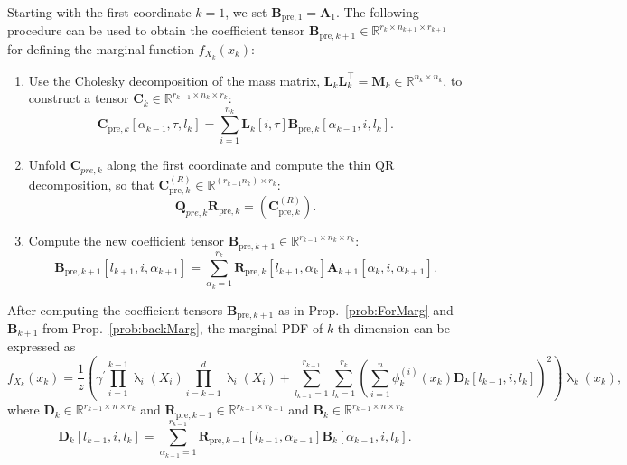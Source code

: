 \begin{prop}
	\label{prob:ForMarg}
	Starting with the first coordinate $k = 1$, we set $\bm{B}_{\text{pre},1} = \bm{A}_1$. The following procedure can be used to obtain the coefficient tensor $\bm{B}_{\text{pre},k+1} \in \mathbb{R}^{r_{k} \times n_{k+1} \times r_{k+1}}$ for defining the marginal function $f_{X_k}(x_k)$:
	\begin{enumerate}
		\item Use the Cholesky decomposition of the mass matrix, $\bm{L}_k \bm{L}_k^\top = \bm{M}_k \in \mathbb{R}^{n_k \times n_k}$, to construct a tensor $\bm{C}_k \in \mathbb{R}^{r_{k-1} \times n_k \times r_k}$:
		\begin{equation}
			\bm{C}_{\text{pre},k}[\alpha_{k-1}, \tau, l_k] = \sum_{i=1}^{n_k} \bm{L}_k[i, \tau] \bm{B}_{\text{pre},k}[\alpha_{k-1}, i, l_k] .
		\end{equation}
		\item Unfold $\bm{C}_{pre,k}$ along the first coordinate and compute the thin QR decomposition, so that $\bm{C}_{\text{pre},k}^{(R)} \in \mathbb{R}^{(r_{k-1} n_k ) \times r_k}$:
		\begin{equation}
			\bm{Q}_{pre,k}\bm{R}_{\text{pre},k} = {(\bm{C}_{\text{pre},k}^{(R)})}.
		\end{equation}
		\item Compute the new coefficient tensor $\bm{B}_{\text{pre}, k+1} \in \mathbb{R}^{r_{k-1} \times n_k \times r_k} $:
		\begin{equation}
			\bm{B}_{\text{pre}, k+1}[l_{k+1}, i, \alpha_{k+1}] = \sum_{\alpha_{k}=1}^{r_{k}} \bm{R}_{\text{pre},k}[l_{k+1}, \alpha_{k}] \bm{A}_{k+1}[\alpha_{k}, i, \alpha_{k+1}] .
		\end{equation}
	\end{enumerate}
\end{prop}
After computing the coefficient tensors $\bm{B}_{\text{pre}, k+1}$ as in Prop.~\ref{prob:ForMarg} and $\bm{B}_{k+1}$ from Prop.~\ref{prob:backMarg}, the marginal PDF of $k$-th dimension can be expressed as
\begin{equation}
	f_{X_k}(x_k) = \frac{1}{z} \left(\gamma^{\prime} \prod_{i=1}^{k-1} \uplambda_i(X_i) \prod_{i=k+1}^{d} \uplambda_i(X_i) + \sum_{l_{k-1}=1}^{r_{k-1}} \sum_{l_k=1}^{r_k} \left(\sum_{i=1}^{n} \phi^{(i)}_k(x_k) \bm{D}_k[l_{k-1},i, l_k] \right)^2 \right) \uplambda_k(x_k),
\end{equation}
where $\bm{D}_k \in \mathbb{R}^{r_{k-1} \times n \times r_k}$ and $\bm{R}_{\text{pre},k-1}\in \mathbb{R}^{r_{k-1} \times r_{k-1}}$ and $\bm{B}_k \in \mathbb{R}^{r_{k-1} \times n \times r_k}$
\begin{equation}
	\bm{D}_k[l_{k-1},i,l_k] = \sum_{\alpha_{k-1}=1}^{r_{k-1}}  \bm{R}_{\text{pre},k-1}[l_{k-1}, \alpha_{k-1}] \bm{B}_k[\alpha_{k-1}, i, l_k].
\end{equation}

